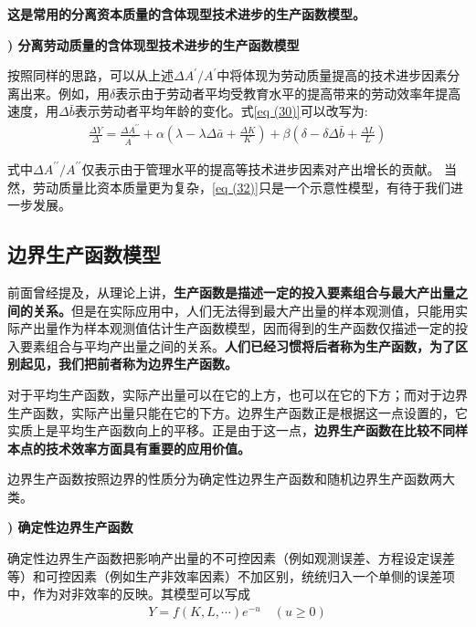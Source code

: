 	\textbf{这是常用的分离资本质量的含体现型技术进步的生产函数模型。}
		
{\bf {}) 分离劳动质量的含体现型技术进步的生产函数模型}

	按照同样的思路，可以从上述$ \Delta A^{\prime}/A^{\prime} $中将体现为劳动质量提高的技术进步因素分离出来。例如，用$ \delta $表示由于劳动者平均受教育水平的提高带来的劳动效率年提高速度，用$ \Delta \bar{b} $表示劳动者平均年龄的变化。式\eqref{eq (30)}可以改写为:
	\begin{align}
		\frac{\Delta Y}{\Delta}=\frac{\Delta A^{\prime \prime}}{A^{\prime \prime}}+\alpha\left(\lambda-\lambda \Delta \bar{a}+\frac{\Delta K}{K}\right)+\beta\left(\delta-\delta \Delta \bar{b}+\frac{\Delta L}{L}\right)
		\label{eq (32)}
	\end{align}

	式中$ \Delta A^{\prime \prime}/A^{\prime \prime} $仅表示由于管理水平的提高等技术进步因素对产出增长的贡献。
	当然，劳动质量比资本质量更为复杂，\eqref{eq (32)}只是一个示意性模型，有待于我们进一步发展。

  \subsection{边界生产函数模型}
		
	前面曾经提及，从理论上讲，\textbf{生产函数是描述一定的投入要素组合与最大产出量之间的关系。}但是在实际应用中，人们无法得到最大产出量的样本观测值，只能用实际产出量作为样本观测值估计生产函数模型，因而得到的生产函数仅描述一定的投入要素组合与平均产出量之间的关系。\textbf{人们已经习惯将后者称为生产函数，为了区别起见，我们把前者称为边界生产函数。}
		
	对于平均生产函数，实际产出量可以在它的上方，也可以在它的下方；而对于边界生产函数，实际产出量只能在它的下方。边界生产函数正是根据这一点设置的，它实质上是平均生产函数向上的平移。正是由于这一点，\textbf{边界生产函数在比较不同样本点的技术效率方面具有重要的应用价值。}
		
	边界生产函数按照边界的性质分为确定性边界生产函数和随机边界生产函数两大类。
		
{\bf {}) 确定性边界生产函数}
		
	确定性边界生产函数把影响产出量的不可控因素（例如观测误差、方程设定误差等）和可控因素（例如生产非效率因素）不加区别，统统归入一个单侧的误差项中，作为对非效率的反映。其模型可以写成
	\begin{align}
		Y=f(K, L, \cdots) e^{-u} \quad(u \geq 0) \label{eq (33)}
	\end{align}
		
